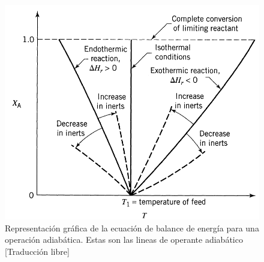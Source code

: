     \begin{multicols}{2}
        \begin{figure}
            \centering
            \includegraphics[width=\textwidth]{img/esquemas/operacion_adiabatica.png}
            \caption[Lineas de operante adiabático]{Representación gráfica de la ecuación de balance de energía para una operación adiabática. Estas son las lineas de operante adiabático [Traducción libre] \cite{levenspiel_chemical_1999}}
            \label{fig:operacion_adiabatica}
        \end{figure}
        

\end{multicols}
